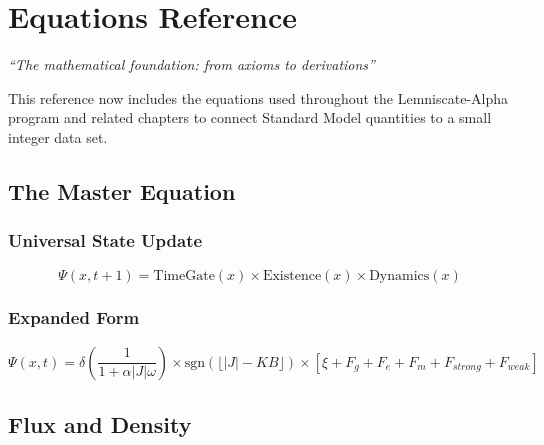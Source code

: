 \documentclass[
  11pt,
  letterpaper,
  twoside,
  openright]{book}
\begin{document}
\chapter{Equations Reference}\label{sec-equations-reference}

\emph{``The mathematical foundation: from axioms to derivations''}

\begin{tcolorbox}[enhanced jigsaw, coltitle=black, colbacktitle=quarto-callout-important-color!10!white, toprule=.15mm, colframe=quarto-callout-important-color-frame, arc=.35mm, opacityback=0, bottomtitle=1mm, toptitle=1mm, breakable, colback=white, titlerule=0mm, opacitybacktitle=0.6, title=\textcolor{quarto-callout-important-color}{\faExclamation}\hspace{0.5em}{Major Update: Derivation Equations Added}, rightrule=.15mm, bottomrule=.15mm, leftrule=.75mm, left=2mm]

This reference now includes the equations used throughout the
Lemniscate-Alpha program and related chapters to connect Standard Model
quantities to a small integer data set.

\end{tcolorbox}

\section{The Master Equation}\label{the-master-equation}

\subsection{Universal State Update}\label{universal-state-update}

\[
\Psi(x, t+1) = \text{TimeGate}(x) \times \text{Existence}(x) \times \text{Dynamics}(x)
\]

\subsection{Expanded Form}\label{expanded-form}

\[
\Psi(x,t) = \delta\left(\frac{1}{1 + \alpha|J|\omega}\right) \times \text{sgn}\left(\lfloor|J| - KB\rfloor\right) \times \left[\xi + F_g + F_e + F_m + F_{strong} + F_{weak}\right]
\]

\section{Flux and Density}\label{flux-and-density}
\end{document}

